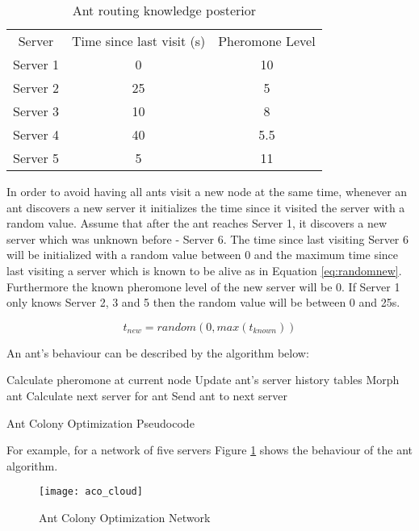 \begin{table}
\centering
\begin{tabular}{c|c|c}
Server & Time since last visit (s) & Pheromone Level \\
Server 1 & 0 & 10 \\
Server 2 & 25 & 5 \\
Server 3 & 10 & 8 \\
Server 4 & 40 & 5.5 \\
Server 5 & 5 & 11 \\
\end{tabular}
\caption{Ant routing knowledge posterior}
\label{tab:ant_post}
\end{table}

In order to avoid having all ants visit a new node at the same time, whenever an ant discovers a new server it initializes the time since it visited the server with a random value. Assume that after the ant reaches Server 1, it discovers a new server which was unknown before - Server 6. The time since last visiting Server 6 will be initialized with a random value between 0 and the maximum time since last visiting a server which is known to be alive as in Equation \ref{eq:randomnew}. Furthermore the known pheromone level of the new server will be 0. If Server 1 only knows Server 2, 3 and 5 then the random value will be between 0 and 25s.

\begin{equation}
t_{new} = random(0, max(t_{known}))
\label{eq:randomnew}
\end{equation}

An ant's behaviour can be described by the algorithm below:

\begin{algorithm}
\begin{algorithmic}
	\State Calculate pheromone at current node
	\State Update ant's server history tables
		\State Morph ant
	\Else
		\State Calculate next server for ant
		\State Send ant to next server
	\EndIf
\end{algorithmic}
\caption{Ant Colony Optimization Pseudocode}\label{ant:pseudocode}
\end{algorithm}

For example, for a network of five servers Figure \ref{fig:antnetwork} shows the behaviour of the ant algorithm.

\begin{figure}
	\centering
	\texttt{[image: aco\_cloud]}
	\caption{Ant Colony Optimization Network}
	\label{fig:antnetwork}
\end{figure}

